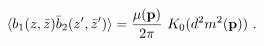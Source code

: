 \begin{equation}\label{2.17}
\langle b_1(z,\bar{z}) \bar{b}_2(z',\bar{z}') \rangle=
{\mu({\bf p}) \over 2\pi}~ K_0(d^2m^2({\bf p}))~.
\end{equation}

